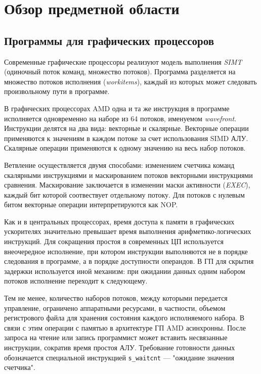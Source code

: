 \documentclass[a4paper,14pt]{extarticle}
\begin{document}
\section{Обзор предметной области}

\subsection{Программы для графических процессоров}

Современные графические процессоры реализуют модель выполнения \textit{SIMT} (одиночный поток
команд, множество потоков). Программа разделяется на множество потоков исполнения (\textit{workitems}),
каждый из которых может следовать произвольному пути в программе.

В графических процессорах AMD одна и та же инструкция в программе исполняется одновременно
на наборе из 64 потоков, именуемом \textit{wavefront}. Инструкции делятся на два вида:
векторные и скалярные. Векторные операции применяются к значениям в каждом потоке
за счет использования SIMD АЛУ. Скалярные операции применяются к одному значению на весь набор
потоков.

Ветвление осуществляется двумя способами: изменением счетчика команд скалярными инструкциями
и маскированием потоков векторными инструкциями сравнения. Маскирование заключается в изменении
маски активности (\textit{EXEC}), каждый бит которой соотвествует отдельному потоку.
Для потоков с нулевым битом векторные операции интерпретируются как NOP.

Как и в центральных процессорах, время доступа к памяти в графических ускорителях значительно
превышает время выполнения арифметико-логических инструкций. Для сокращения простоя в современных
ЦП используется внеочередное исполнение, при котором инструкции выполняются не в порядке следования
в программе, а в порядке доступности операндов. В ГП для скрытия задержки используется иной механизм:
при ожидании данных одним набором потоков исполнение переходит к следующему.

Тем не менее, количество наборов потоков, между которыми передается управление, ограничено
аппаратными ресурсами, в частности, объемом регистрового файла для хранения состояния каждого
исполняемого набора. В связи с этим операции с памятью в архитектуре ГП AMD асинхронны.
После запроса на чтение или запись программист может вставить несвязанные инструкции,
сократив время простоя АЛУ. Требование готовности данных обозначается специальной
инструкцией \texttt{s\_waitcnt} — "ожидание значения счетчика".
\end{document}
